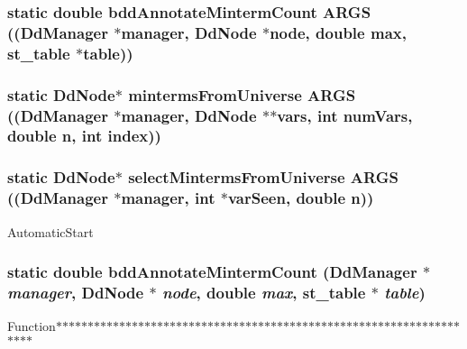\subsubsection{\setlength{\rightskip}{0pt plus 5cm}static double bdd\-Annotate\-Minterm\-Count ARGS ((\bf{Dd\-Manager} $\ast$manager, \bf{Dd\-Node} $\ast$node, double \bf{max}, \bf{st\_\-table} $\ast$table))\hspace{0.3cm}{\tt  [static]}}\label{cuddSplit_8c_975f718ae3a2e9b1d52e6ac2c7613296}


\subsubsection{\setlength{\rightskip}{0pt plus 5cm}static \bf{Dd\-Node}$\ast$ minterms\-From\-Universe ARGS ((\bf{Dd\-Manager} $\ast$manager, \bf{Dd\-Node} $\ast$$\ast$vars, int num\-Vars, double n, int index))\hspace{0.3cm}{\tt  [static]}}\label{cuddSplit_8c_a4f942027f652589dd866774e2ae66bd}


\subsubsection{\setlength{\rightskip}{0pt plus 5cm}static \bf{Dd\-Node}$\ast$ select\-Minterms\-From\-Universe ARGS ((\bf{Dd\-Manager} $\ast$manager, int $\ast$var\-Seen, double n))\hspace{0.3cm}{\tt  [static]}}\label{cuddSplit_8c_918fe1e16db9686e0125e4d990049409}


Automatic\-Start 
\subsubsection{\setlength{\rightskip}{0pt plus 5cm}static double bdd\-Annotate\-Minterm\-Count (\bf{Dd\-Manager} $\ast$ {\em manager}, \bf{Dd\-Node} $\ast$ {\em node}, double {\em max}, \bf{st\_\-table} $\ast$ {\em table})\hspace{0.3cm}{\tt  [static]}}\label{cuddSplit_8c_75ec00e090efd41df105e54a8b4729ef}


Function$\ast$$\ast$$\ast$$\ast$$\ast$$\ast$$\ast$$\ast$$\ast$$\ast$$\ast$$\ast$$\ast$$\ast$$\ast$$\ast$$\ast$$\ast$$\ast$$\ast$$\ast$$\ast$$\ast$$\ast$$\ast$$\ast$$\ast$$\ast$$\ast$$\ast$$\ast$$\ast$$\ast$$\ast$$\ast$$\ast$$\ast$$\ast$$\ast$$\ast$$\ast$$\ast$$\ast$$\ast$$\ast$$\ast$$\ast$$\ast$$\ast$$\ast$$\ast$$\ast$$\ast$$\ast$$\ast$$\ast$$\ast$$\ast$$\ast$$\ast$$\ast$$\ast$$\ast$$\ast$$\ast$$\ast$$\ast$$\ast$

